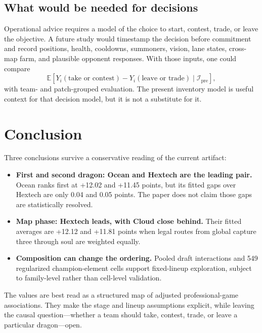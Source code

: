 \documentclass[10pt,letterpaper]{article}
\begin{document}
\subsection{What would be needed for decisions}
Operational advice requires a model of the choice to start, contest, trade, or leave the objective. A future study would timestamp the decision before commitment and record positions, health, cooldowns, summoners, vision, lane states, cross-map farm, and plausible opponent responses. With those inputs, one could compare
\begin{equation}
\mathbb E\!\left[
Y_i(\text{take or contest})-Y_i(\text{leave or trade})
\mid\mathcal I_{\mathrm{pre}}
\right],
\end{equation}
with team- and patch-grouped evaluation. The present inventory model is useful context for that decision model, but it is not a substitute for it.

\section{Conclusion}
Three conclusions survive a conservative reading of the current artifact:
\begin{itemize}[leftmargin=1.2em,itemsep=0.28em,topsep=0.20em]
\item \textbf{First and second dragon: Ocean and Hextech are the leading pair.} Ocean ranks first at +12.02 and +11.45 points, but its fitted gaps over Hextech are only 0.04 and 0.05 points. The paper does not claim those gaps are statistically resolved.
\item \textbf{Map phase: Hextech leads, with Cloud close behind.} Their fitted averages are +12.12 and +11.81 points when legal routes from global capture three through soul are weighted equally.
\item \textbf{Composition can change the ordering.} Pooled draft interactions and 549 regularized champion-element cells support fixed-lineup exploration, subject to family-level rather than cell-level validation.
\end{itemize}

The values are best read as a structured map of adjusted professional-game associations. They make the stage and lineup assumptions explicit, while leaving the causal question---whether a team should take, contest, trade, or leave a particular dragon---open.
\end{document}
